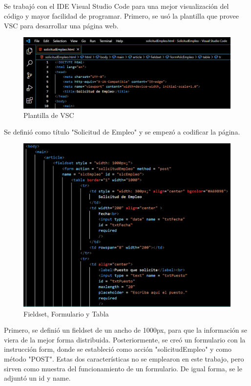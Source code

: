 \documentclass[10pt,a4paper]{article}
\begin{document}
\subsection{
	\textit{
		\color{colorESCOM}{Modelo E-R}
	}
}
Se trabajó con el IDE Visual Studio Code para una mejor visualización del código y mayor facilidad de programar.
Primero, se usó la plantilla que provee VSC para desarrollar una página web.

\begin{figure}[H]
	\includegraphics[scale=.54]{Capture}
	\centering
	\caption{Plantilla de VSC}
	\label{img:Capture}
\end{figure} 

Se definió como título "Solicitud de Empleo" y se empezó a codificar la página.

\begin{figure}[H]
	\includegraphics[scale=.54]{Capture2}
	\centering
	\caption{Fieldset, Formulario y Tabla}
	\label{img:Capture2}
\end{figure} 

Primero, se definió un fieldset de un ancho de 1000px, para que la información se viera de la mejor forma distribuida. Posteriormente, se creó un formulario con la instrucción form, donde se estableció como acción "solicitudEmpleo" y como método "POST". Estas dos características no se emplearon en este trabajo, pero sirven como muestra del funcionamiento de un formulario. De igual forma, se le adjuntó un id y name.
\end{document}
